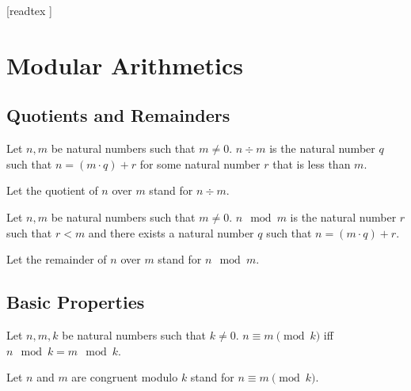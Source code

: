 \documentclass[10pt]{article}
\begin{document}
  \begin{imports}
    \begin{forthel}
      [readtex ]
    \end{forthel}
  \end{imports}


  \section*{Modular Arithmetics}

  \subsection*{Quotients and Remainders}

  \begin{forthel}
    \begin{definition}[id=ARITHMETIC_08_8621463798022144,printid]
      Let $n, m$ be natural numbers such that $m \neq 0$.
      $n \div m$ is the natural number $q$ such that $n = (m \cdot q) + r$ for some natural number $r$ that is less than $m$.
    \end{definition}

    Let the quotient of $n$ over $m$ stand for $n \div m$.
  \end{forthel}

  \begin{forthel}
    \begin{definition}[id=ARITHMETIC_08_3560980160184320,printid]
      Let $n, m$ be natural numbers such that $m \neq 0$.
      $n \mod m$ is the natural number $r$ such that $r < m$ and there exists a natural number $q$ such that $n = (m \cdot q) + r$.
    \end{definition}

    Let the remainder of $n$ over $m$ stand for $n \mod m$.
  \end{forthel}


  \subsection*{Basic Properties}

  \begin{forthel}
    \begin{definition}[id=ARITHMETIC_08_5448561831444480,printid]
      Let $n, m, k$ be natural numbers such that $k \neq 0$.
      $n \equiv m \pmod{k}$ iff $n \mod k = m \mod k$.
    \end{definition}

    Let $n$ and $m$ are congruent modulo $k$ stand for $n \equiv m \pmod{k}$.
  \end{forthel}
\end{document}
